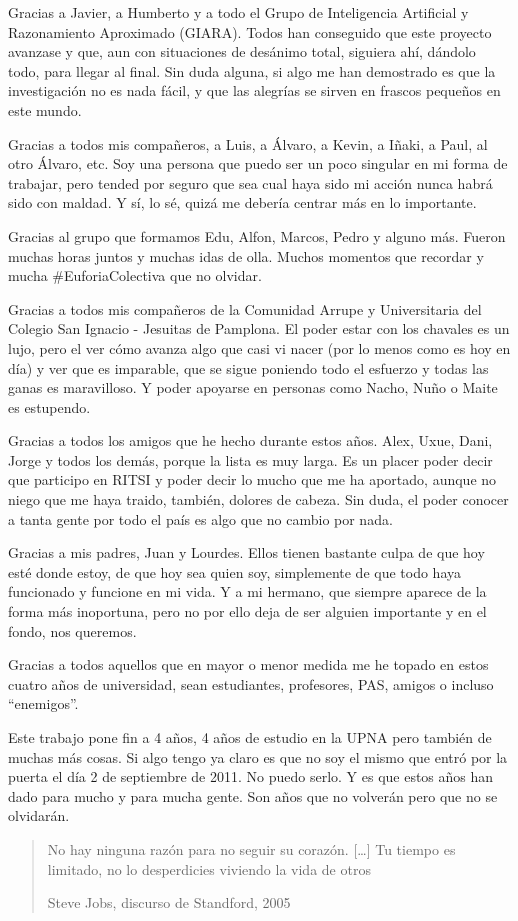 \documentclass[main]{subfiles}
\begin{document}
\begin{center}

Gracias a Javier, a Humberto y a todo el Grupo de Inteligencia Artificial y Razonamiento Aproximado (GIARA). Todos han conseguido que este proyecto avanzase y que, aun con situaciones de desánimo total, siguiera ahí, dándolo todo, para llegar al final. Sin duda alguna, si algo me han demostrado es que la investigación no es nada fácil, y que las alegrías se sirven en frascos pequeños en este mundo.

Gracias a todos mis compañeros, a Luis, a Álvaro, a Kevin, a Iñaki, a Paul, al otro Álvaro, etc. Soy una persona que puedo ser un poco singular en mi forma de trabajar, pero tended por seguro que sea cual haya sido mi acción nunca habrá sido con maldad. Y sí, lo sé, quizá me debería centrar más en lo importante.

Gracias al grupo que formamos Edu, Alfon, Marcos, Pedro y alguno más. Fueron muchas horas juntos y muchas idas de olla. Muchos momentos que recordar y mucha \#EuforiaColectiva que no olvidar.

Gracias a todos mis compañeros de la Comunidad Arrupe y Universitaria del Colegio San Ignacio - Jesuitas de Pamplona. El poder estar con los chavales es un lujo, pero el ver cómo avanza algo que casi vi nacer (por lo menos como es hoy en día) y ver que es imparable, que se sigue poniendo todo el esfuerzo y todas las ganas es maravilloso. Y poder apoyarse en personas como Nacho, Nuño o Maite es estupendo.

Gracias a todos los amigos que he hecho durante estos años. Alex, Uxue, Dani, Jorge y todos los demás, porque la lista es muy larga. Es un placer poder decir que participo en RITSI y poder decir lo mucho que me ha aportado, aunque no niego que me haya traido, también, dolores de cabeza. Sin duda, el poder conocer a tanta gente por todo el país es algo que no cambio por nada.

Gracias a mis padres, Juan y Lourdes. Ellos tienen bastante culpa de que hoy esté donde estoy, de que hoy sea quien soy, simplemente de que todo haya funcionado y funcione en mi vida. Y a mi hermano, que siempre aparece de la forma más inoportuna, pero no por ello deja de ser alguien importante y en el fondo, nos queremos.

Gracias a todos aquellos que en mayor o menor medida me he topado en estos cuatro años de universidad, sean estudiantes, profesores, PAS, amigos o incluso \enquote{enemigos}.

Este trabajo pone fin a 4 años, 4 años de estudio en la UPNA pero también de muchas más cosas. Si algo tengo ya claro es que no soy el mismo que entró por la puerta el día 2 de septiembre de 2011. No puedo serlo. Y es que estos años han dado para mucho y para mucha gente. Son años que no volverán pero que no se olvidarán.

\blockquote[Steve Jobs, discurso de Standford, 2005]{No hay ninguna razón para no seguir su corazón. [\dots] Tu tiempo es limitado, no lo desperdicies viviendo la vida de otros}

\end{center}
\end{document}
